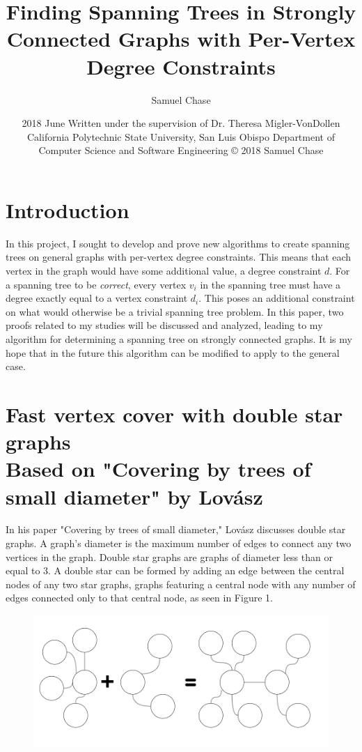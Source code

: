 \documentclass{article}
\title{Finding Spanning Trees in Strongly Connected Graphs with Per-Vertex Degree Constraints}
\author{Samuel Chase}
\date{2018 June \linebreak\linebreak
	\small{Written under the supervision of Dr. Theresa Migler-VonDollen\linebreak\linebreak
	California Polytechnic State University, San Luis Obispo \linebreak\linebreak
	Department of Computer Science and Software Engineering \linebreak\linebreak
	© 2018 Samuel Chase}}
\begin{document}
	\maketitle
	
	\tableofcontents
	\newpage
	\section{Introduction}
	In this project, I sought to develop and prove new algorithms to create spanning trees on general graphs with per-vertex degree constraints. 
	This means that each vertex in the graph would have some additional value, a degree constraint $d$. For a spanning tree to be \textit{correct}, every vertex $v_{i}$ in the spanning tree must have a degree exactly equal to a vertex constraint $d_{i}$. This poses an additional constraint on what
	would otherwise be a trivial spanning tree problem. In this paper, two proofs related to my studies will be discussed and analyzed, leading to my algorithm for determining a spanning tree on strongly connected graphs. It is my hope that in the future this algorithm can be modified to apply to the general case.
	
	
	
	\section{Fast vertex cover with double star graphs \\ {\small Based on "Covering by trees of small diameter" by Lov\'asz \cite{1}} }
	In his paper "Covering by trees of small diameter," Lov\'asz discusses double star graphs. A graph's diameter is the maximum number of edges to connect any two vertices in the graph. Double star graphs are graphs of diameter less than or equal to 3. A double star can be formed by adding an edge between the central nodes of any two star graphs, graphs featuring a central node with any number of edges connected only to that central node, as seen in Figure 1.
	\begin{figure}[H]
		\caption{}
		\includegraphics{Figure1}
	\end{figure}
	
\end{document}
